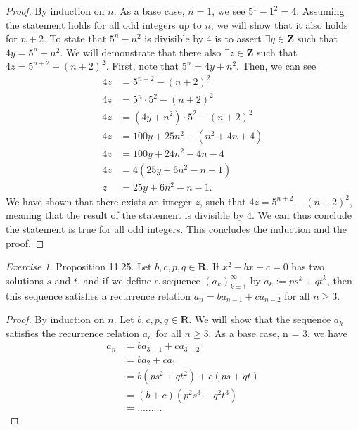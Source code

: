 \documentclass[12pt,oneside]{amsart}
\theoremstyle{remark}
\newtheorem{exer}{Exercise}
\newcommand{\bfZ}{\mathbf{Z}}
\newcommand{\bfR}{\mathbf{R}}
\begin{document}
\begin{proof}
By induction on $n$. As a base case, $n = 1$, we see $5^1 - 1^2 = 4$. Assuming the statement holds for all odd integers up to $n$, we will show that it also holds for $n + 2$. To state that $5^n - n^2$ is divisible by 4 is to assert $\exists y \in \bfZ$ such that $4y = 5^n - n^2$. We will demonstrate that there also $\exists z \in \bfZ$ such that $4z = 5^{n + 2} - (n + 2)^2$. First, note that $5^n = 4y + n^2$. Then, we can see
\begin{align*}
4z &= 5^{n + 2} - (n + 2)^2 \\
4z &= 5^n \cdot 5^2 - (n + 2)^2 \\
4z &= (4y + n^2) \cdot 5^2 - (n + 2)^2 \tag{by hypothesis} \\
4z &= 100y + 25n^2 - (n^2 + 4n + 4) \tag{distributing and expanding} \\
4z &= 100y + 24n^2 - 4n - 4 \tag{simplifying} \\
4z &= 4(25y + 6n^2 - n - 1) \\
 z &= 25y + 6n^2 - n - 1.
\end{align*}
We have shown that there exists an integer $z$, such that $4z = 5^{n + 2} - (n + 2)^2$, meaning that the result of the statement is divisible by 4. We can thus conclude the statement is true for all odd integers. This concludes the induction and the proof.
\end{proof}

\newpage
\begin{exer}
Proposition 11.25. Let $b, c, p, q \in \bfR$. If $x^2 - bx - c = 0$ has two solutions $s$ and $t$, and if we define a sequence $(a_k)_{k = 1}^\infty$ by $a_k := ps^k + qt^k$, then this sequence satisfies a recurrence relation $a_n = ba_{n - 1} + ca_{n - 2}$ for all $n \geq 3$.
\end{exer}


\begin{proof}
By induction on $n$. Let $b, c, p, q \in \bfR$. We will show that the sequence $a_k$ satisfies the recurrence relation $a_n$ for all $n \geq 3$. As a base case, n = 3, we have
\begin{align*}
a_n &= ba_{3 - 1} + ca_{3 - 2} \\
    &= ba_2 + ca_1 \\
    &= b(ps^2 + qt^2) + c(ps + qt) \\
    &= (b + c)(p^2s^3 + q^2t^3) \\
    &= ... ... ...
\end{align*}
\end{proof}
\end{document}
